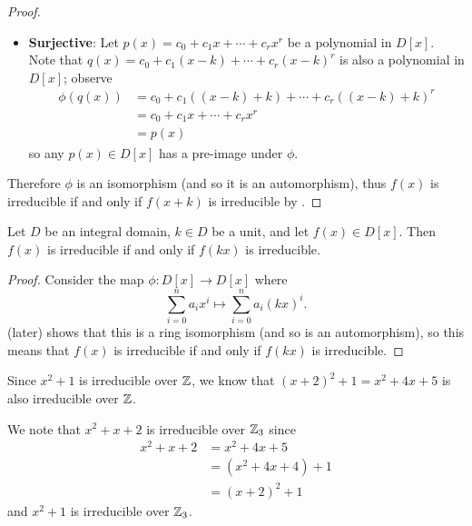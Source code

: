 \begin{proof}
\begin{itemize}
        \item \textbf{Surjective}: Let $p(x) = c_0 + c_1x + \cdots + c_rx^r$ be a polynomial in $D[x]$. Note that $q(x) = c_0 + c_1(x-k) + \cdots + c_r(x-k)^r$ is also a polynomial in $D[x]$; observe
        \begin{align*}
            \phi(q(x)) &= c_0 + c_1((x-k)+k) + \cdots + c_r((x-k)+k)^r\\
            &= c_0 + c_1x + \cdots + c_rx^r\\
            &= p(x)
        \end{align*}
        so any $p(x) \in D[x]$ has a pre-image under $\phi$.
    \end{itemize}
    Therefore $\phi$ is an isomorphism (and so it is an automorphism), thus $f(x)$ is irreducible if and only if $f(x+k)$ is irreducible by .
\end{proof}

\begin{corollary}\label{corollary-irreducible-iff-constant-factor-multiple-is-irreducible}
    Let $D$ be an integral domain, $k \in D$ be a unit, and let $f(x) \in D[x]$. Then $f(x)$ is irreducible if and only if $f(kx)$ is irreducible.
\end{corollary}
\begin{proof}
    Consider the map $\phi: D[x] \to D[x]$ where
    \[
        \sum_{i=0}^n a_ix^i \mapsto \sum_{i=0}^na_i(kx)^i.  
    \]
     (later) shows that this is a ring isomorphism (and so is an automorphism), so this means that $f(x)$ is irreducible if and only if $f(kx)$ is irreducible.
\end{proof}

\begin{example}
    Since $x^2 + 1$ is irreducible over $\mathbb{Z}$, we know that $(x+2)^2 + 1 = x^2 + 4x + 5$ is also irreducible over $\mathbb{Z}$.
\end{example}

\begin{example}
    We note that $x^2 + x + 2$ is irreducible over $\mathbb{Z}_3$ since
    \begin{align*}
        x^2 + x + 2 &= x^2 + 4x + 5\\
        &= (x^2 + 4x + 4) + 1\\
        &= (x+2)^2 + 1
    \end{align*}
    and $x^2 + 1$ is irreducible over $\mathbb{Z}_3$.
\end{example}

